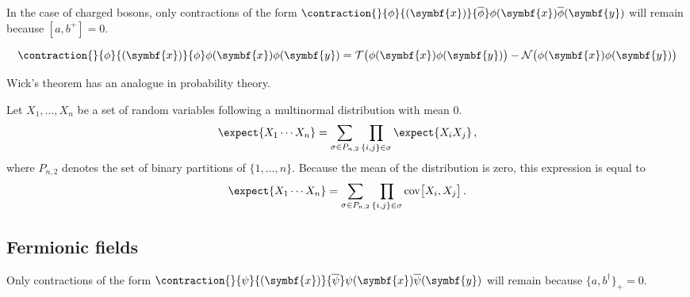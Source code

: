     \begin{remark}
        In the case of charged bosons, only contractions of the form $\contraction{}{\phi}{(\symbf{x})}{\overline\phi}\phi(\symbf{x})\overline\phi(\symbf{y})$ will remain because $[a,b^+]=0$.
    \end{remark}

    \begin{result}
        \begin{gather}
            \contraction{}{\phi}{(\symbf{x})}{\phi}\phi(\symbf{x})\phi(\symbf{y}) = \mathcal{T}\bigl(\phi(\symbf{x})\phi(\symbf{y})\bigr) - \mathcal{N}\bigl(\phi(\symbf{x})\phi(\symbf{y})\bigr)
        \end{gather}
    \end{result}

    Wick's theorem has an analogue in probability theory.
    \begin{theorem}[Isserlis]
        Let $X_1,\ldots,X_n$ be a set of random variables following a multinormal distribution with mean 0.
        \begin{gather}
            \expect{X_1\cdots X_n} = \sum_{\sigma\in P_{n,2}}\prod_{\{i,j\}\in\sigma}\expect{X_iX_j}\,,
        \end{gather}
        where $P_{n,2}$ denotes the set of binary partitions of $\{1,\ldots,n\}$. Because the mean of the distribution is zero, this expression is equal to
        \begin{gather}
            \expect{X_1\cdots X_n} = \sum_{\sigma\in P_{n,2}}\prod_{\{i,j\}\in\sigma}\mathrm{cov}\bigl[X_i,X_j\bigr]\,.
        \end{gather}
    \end{theorem}

\subsection{Fermionic fields}

    \begin{remark}
        Only contractions of the form $\contraction{}{\psi}{(\symbf{x})}{\overline\psi}\psi(\symbf{x})\overline\psi(\symbf{y})$ will remain because $\{a,b^\dag\}_+=0$.
    \end{remark}

